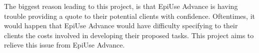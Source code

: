 The biggest reason leading to this project, is that EpiUse Advance is having trouble providing a quote to their potential clients with confidence. Oftentimes, it would happen that EpiUse Advance would have difficulty specifying to their clients the costs involved in developing their proposed tasks. This project aims to relieve this issue from EpiUse Advance.